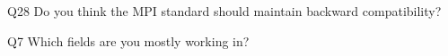\begin{description}%
\item{Q28} Do you think the MPI standard should maintain backward compatibility?%
\item{Q7} Which fields are you mostly working in?%
\end{description}%
